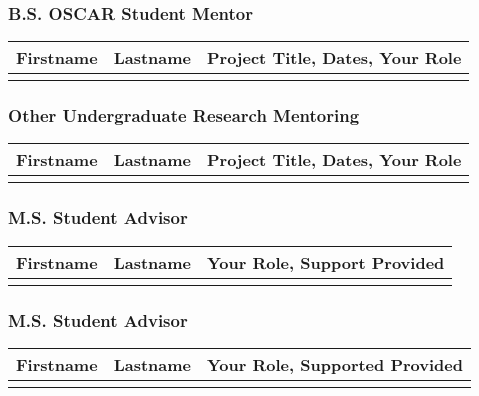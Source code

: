 \documentclass[11pt]{article}
\begin{document}
\subsubsection{B.S. OSCAR Student Mentor}
\begin{center}
\begin{tabular}{ccc}
  \toprule
  \textbf{Firstname}&\textbf{Lastname}&\textbf{Project Title, Dates, Your Role}\\
  \midrule
                      & & \\
  \bottomrule
\end{tabular}
\end{center}

\subsubsection{Other Undergraduate Research Mentoring}
\begin{center}
\begin{tabular}{ccc}
  \toprule
  \textbf{Firstname}&\textbf{Lastname}&\textbf{Project Title, Dates, Your Role}\\
    \midrule
                    & & \\
  \bottomrule
\end{tabular}
\end{center}


\subsubsection{M.S. Student Advisor}
\begin{center}
  \begin{tabular}{ccc}
    \toprule
    \textbf{Firstname}&\textbf{Lastname}&\textbf{Your Role, Support Provided}\\
    \midrule
                      & & \\
    \bottomrule
  \end{tabular}
\end{center}



\subsubsection{M.S. Student Advisor}
\begin{center}
  \begin{tabular}{ccc}
    \toprule
    \textbf{Firstname}&\textbf{Lastname}&\textbf{Your Role, Supported Provided}\\
    \midrule
    & & \\
    \bottomrule
  \end{tabular}
\end{center}
\end{document}
